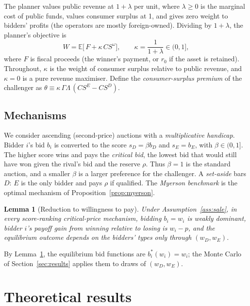 \documentclass[12pt,a4paper]{article}
\newtheorem{lemma}{Lemma}
\theoremstyle{definition}
\theoremstyle{remark}
\newcommand{\E}{\mathbb{E}}
\begin{document}
The planner values public revenue at $1+\lambda$ per unit, where $\lambda\ge0$ is the marginal cost of public funds, values consumer surplus at 1, and gives zero weight to bidders' profits (the operators are mostly foreign-owned). Dividing by $1+\lambda$, the planner's objective is
\begin{equation}\label{eq:W}
W=\E\big[\,F+\kappa\,CS^{\omega}\big],\qquad \kappa=\frac{1}{1+\lambda}\in(0,1],
\end{equation}
where $F$ is fiscal proceeds (the winner's payment, or $r_0$ if the asset is retained). Throughout, $\kappa$ is the weight of consumer surplus relative to public revenue, and $\kappa=0$ is a pure revenue maximiser. Define the \emph{consumer-surplus premium} of the challenger as $\theta\equiv\kappa\,\Gamma\Lambda\,(CS^E-CS^D)$.

\subsection{Mechanisms}

We consider ascending (second-price) auctions with a \emph{multiplicative handicap}. Bidder $i$'s bid $b_i$ is converted to the score $s_D=\beta b_D$ and $s_E=b_E$, with $\beta\in(0,1]$. The higher score wins and pays the \emph{critical bid}, the lowest bid that would still have won given the rival's bid and the reserve $\rho$. Thus $\beta=1$ is the standard auction, and a smaller $\beta$ is a larger preference for the challenger. A \emph{set-aside} bars $D$: $E$ is the only bidder and pays $\rho$ if qualified. The \emph{Myerson benchmark} is the optimal mechanism of Proposition~\ref{prop:myerson}.

\begin{lemma}[Reduction to willingness to pay]\label{lem:wtp}
Under Assumption~\ref{ass:sale}, in every score-ranking critical-price mechanism, bidding $b_i=w_i$ is weakly dominant, bidder $i$'s payoff gain from winning relative to losing is $w_i-p$, and the equilibrium outcome depends on the bidders' types only through $(w_D,w_E)$.
\end{lemma}

By Lemma~\ref{lem:wtp}, the equilibrium bid functions are $b_i^*(w_i)=w_i$; the Monte Carlo of Section~\ref{sec:results} applies them to draws of $(w_D,w_E)$.

\section{Theoretical results}\label{sec:theory}
\end{document}
